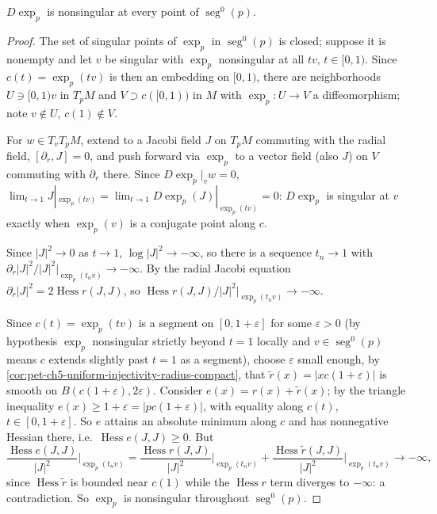 \begin{lemma}
  \label{lem:pet-ch5-exp-nonsingular-segment-domain}
  $D\exp_p$ is nonsingular at every point of $\operatorname{seg}^0(p)$.
\end{lemma}
\begin{proof}
  The set of singular points of $\exp_p$ in $\operatorname{seg}^0(p)$ is closed;
  suppose it is nonempty and let $v$ be singular with $\exp_p$ nonsingular at all
  $tv$, $t\in[0,1)$. Since $c(t)=\exp_p(tv)$ is then an embedding on $[0,1)$, there
  are neighborhoods $U\ni[0,1)v$ in $T_pM$ and $V\supset c([0,1))$ in $M$ with
  $\exp_p:U\to V$ a diffeomorphism; note $v\notin U$, $c(1)\notin V$.

  For $w\in T_vT_pM$, extend to a Jacobi field $J$ on $T_pM$ commuting with the
  radial field, $[\partial_r,J]=0$, and push forward via $\exp_p$ to a vector field
  (also $J$) on $V$ commuting with $\partial_r$ there. Since $D\exp_p|_vw=0$,
  $\lim_{t\to1}J|_{\exp_p(tv)}=\lim_{t\to1}D\exp_p(J)|_{\exp_p(tv)}=0$: $D\exp_p$ is
  singular at $v$ exactly when $\exp_p(v)$ is a conjugate point along $c$.

  Since $|J|^2\to0$ as $t\to1$, $\log|J|^2\to-\infty$, so there is a sequence
  $t_n\to1$ with $\partial_r|J|^2/|J|^2|_{\exp_p(t_nv)}\to-\infty$. By the radial
  Jacobi equation $\partial_r|J|^2=2\operatorname{Hess}r(J,J)$, so
  $\operatorname{Hess}r(J,J)/|J|^2|_{\exp_p(t_nv)}\to-\infty$.

  Since $c(t)=\exp_p(tv)$ is a segment on $[0,1+\varepsilon]$ for some
  $\varepsilon>0$ (by hypothesis $\exp_p$ nonsingular strictly beyond $t=1$ locally
  and $v\in\operatorname{seg}^0(p)$ means $c$ extends slightly past $t=1$ as a
  segment), choose $\varepsilon$ small enough, by
  \cref{cor:pet-ch5-uniform-injectivity-radius-compact}, that
  $\tilde r(x)=|xc(1+\varepsilon)|$ is smooth on $B(c(1+\varepsilon),2\varepsilon)$.
  Consider $e(x)=r(x)+\tilde r(x)$; by the triangle inequality
  $e(x)\ge1+\varepsilon=|pc(1+\varepsilon)|$, with equality along $c(t)$,
  $t\in[0,1+\varepsilon]$. So $e$ attains an absolute minimum along $c$ and has
  nonnegative Hessian there, i.e.\ $\operatorname{Hess}e(J,J)\ge0$. But
  \[
    \frac{\operatorname{Hess}e(J,J)}{|J|^2}\Big|_{\exp_p(t_nv)}
    =\frac{\operatorname{Hess}r(J,J)}{|J|^2}\Big|_{\exp_p(t_nv)}
    +\frac{\operatorname{Hess}\tilde r(J,J)}{|J|^2}\Big|_{\exp_p(t_nv)}\to-\infty,
  \]
  since $\operatorname{Hess}\tilde r$ is bounded near $c(1)$ while the
  $\operatorname{Hess}r$ term diverges to $-\infty$: a contradiction. So $\exp_p$
  is nonsingular throughout $\operatorname{seg}^0(p)$.
\end{proof}


